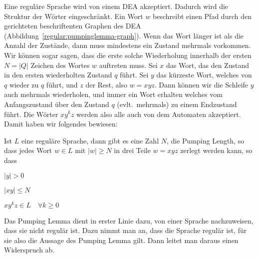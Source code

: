 Eine reguläre Sprache wird von einem DEA akzeptiert.
Dadurch wird die Struktur der Wörter eingeschränkt.
Ein Wort $w$ beschreibt
einen Pfad durch den gerichteten beschriftenten Graphen des DEA
(Abbildung~\ref{regular:pumpinglemma-graph}).
Wenn das Wort länger ist als die Anzahl der Zustände, dann muss
mindestens ein Zustand mehrmals vorkommen.
Wir können sogar
sagen, dass die erste solche Wiederholung innerhalb der ersten
$N = |Q|$ Zeichen des Wortes $w$ auftreten muss.
Sei $x$ das Wort,
das den Zustand in den ersten wiederholten Zustand $q$ führt.
Sei $y$ das kürzeste Wort, welches von $q$ wieder zu $q$ führt, und
$z$ der Rest, also $w=xyz$.
Dann können wir die Schleife $y$
auch mehrmals wiederholen, und immer ein Wort erhalten welches
vom Anfangszustand über den Zustand $q$ (evlt.~mehrmals) zu einem
Endzustand führt.
Die Wörter $xy^kz$ werden also alle auch von dem Automaten akzeptiert.
Damit haben wir folgendes bewiesen:
\begin{satz}
%
Ist $L$ eine reguläre Sprache, dann gibt es eine Zahl $N$, die Pumping Length, so dass
jedes Wort $w\in L$ mit $|w|\ge N$ in drei Teile
$w=xyz$ zerlegt werden kann, so dass
\begin{compactenum}
\item $|y| > 0$
\item $|xy|\le N$
\item $xy^kz\in L\quad\forall k\ge 0$
\end{compactenum}
\end{satz}

Das Pumping Lemma dient in erster Linie dazu, von einer Sprache
nachzuweisen, dass sie nicht regulär ist.
Dazu nimmt man an, dass die Sprache regulär ist, für sie also die Aussage
des Pumping Lemma gilt.
Dann leitet man daraus einen Widerspruch ab.


